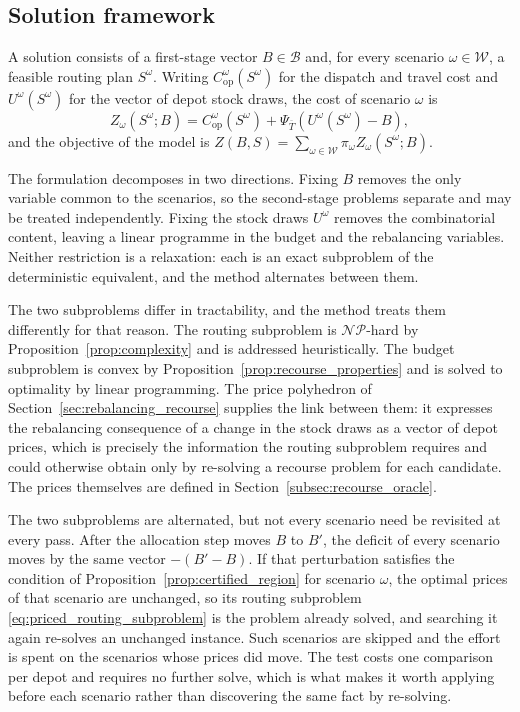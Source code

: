 \documentclass[authoryear,final,3p,times]{elsarticle}
\theoremstyle{definition}
\theoremstyle{plain}
\begin{document}
\subsection{Solution framework}
\label{subsec:ppbrc_architecture}
\label{subsec:ppbrc_overall}

A solution consists of a first-stage vector $B\in\mathcal B$ and, for every
scenario $\omega\in\mathcal W$, a feasible routing plan $S^\omega$. Writing
$C_{\mathrm{op}}^\omega(S^\omega)$ for the dispatch and travel cost and
$U^\omega(S^\omega)$ for the vector of depot stock draws, the cost of scenario
$\omega$ is
\begin{equation}
 Z_\omega(S^\omega;B)
 =C_{\mathrm{op}}^\omega(S^\omega)
 +\Psi_{\overline T}\!\left(U^\omega(S^\omega)-B\right),
 \label{eq:ppbrc_true_scenario}
\end{equation}
and the objective of the model is
$Z(B,S)=\sum_{\omega\in\mathcal W}\pi_\omega Z_\omega(S^\omega;B)$.

The formulation decomposes in two directions. Fixing $B$ removes the only
variable common to the scenarios, so the second-stage problems separate and
may be treated independently. Fixing the stock draws $U^\omega$ removes the
combinatorial content, leaving a linear programme in the budget and the
rebalancing variables. Neither restriction is a relaxation: each is an exact
subproblem of the deterministic equivalent, and the method alternates between
them.

The two subproblems differ in tractability, and the method treats them
differently for that reason. The routing subproblem is $\mathcal{NP}$-hard by
Proposition~\ref{prop:complexity} and is addressed heuristically. The budget
subproblem is convex by Proposition~\ref{prop:recourse_properties} and is
solved to optimality by linear programming. The price polyhedron of
Section~\ref{sec:rebalancing_recourse} supplies the link between them: it
expresses the rebalancing consequence of a change in the stock draws as a vector of
depot prices, which is precisely the information the routing subproblem
requires and could otherwise obtain only by re-solving a recourse problem for
each candidate. The prices themselves are defined in
Section~\ref{subsec:recourse_oracle}.

The two subproblems are alternated, but not every scenario need be revisited
at every pass. After the allocation step moves $B$ to $B'$, the deficit of every
scenario moves by the same vector $-(B'-B)$. If that perturbation satisfies
the condition of Proposition~\ref{prop:certified_region} for scenario
$\omega$, the optimal prices of that scenario are unchanged, so its routing
subproblem \eqref{eq:priced_routing_subproblem} is the problem already solved,
and searching it again re-solves an unchanged instance. Such scenarios are
skipped and the effort is spent on the scenarios whose prices did move. The
test costs one comparison per depot and requires no further solve, which is
what makes it worth applying before each scenario rather than discovering the
same fact by re-solving.
\end{document}
